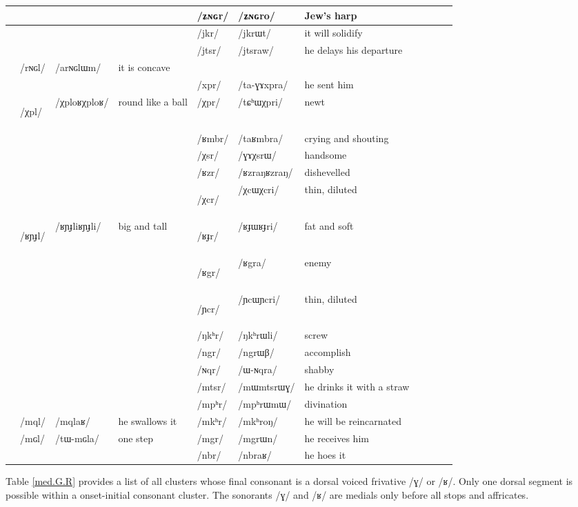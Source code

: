 \documentclass[oneside,a4paper,11pt]{article}
\newcommand{\ipa}[1]{\mbox{\phon/#1/}}
\newcommand{\trois}[1]{\ipa{#1}\addtocounter{3clusters}{1}}
\newcommand{\tib}[1]{\cellcolor{lightgray}\textbf{#1}}
\newcommand{\idph}[1]{\cellcolor{gray}\textbf{#1}}
\newcommand{\resetcounters}[2]{
\newcounter{#1}
\newcounter{#2}
 \setcounter{#1}{\value{2clusters}}
  \setcounter{#2}{\value{3clusters}}
 \setcounter{2clusters}{0}
  \setcounter{3clusters}{0}
}
\begin{document}
\begin{table}
{\begin{tabular}{l|lll|lll|lll|l}
	&	&	&	& \trois{ʑɴɢr}  	& \ipa{ʑɴɢro}  	&Jew's harp 	\\	
\midrule							
	&	&	&	&\trois{jkr}  	& \ipa{jkrɯt}  	& it will solidify \\	
	&	&	&	&\trois{jtsr}  	& \ipa{jtsraw}  	&he delays his departure \\	
\midrule			
	& \trois{rɴɢl}  	& \ipa{arɴɢlɯm}  	&it is concave 	&	&	&\\	
	&	&	&	& \trois{xpr}  	& \ipa{ta-ɣɤxpra}  	&he sent him \\	
\midrule							
	&\trois{χpl} \idph{}	&\ipa{χploʁχploʁ}  	&round like a ball	&\trois{χpr}  	& \ipa{tɕʰɯχpri}  	& newt\\	
	&	&	&	&\trois{ʁmbr}  	& \ipa{taʁmbra}  	& crying and shouting\\	
	&	&	&	&\trois{χsr}  	& \ipa{ɣɤχsrɯ}  	& handsome \\	
	&	&	&	&\trois{ʁzr}  	& \ipa{ʁzraŋʁzraŋ}  	& dishevelled\\	
	&	&	&	&\trois{χcr} \idph{} 	& \ipa{χcɯχcri}  	& thin, diluted \\	
	&\trois{ʁɲɟl}  \idph{}	& \ipa{ʁɲɟliʁɲɟli}  	& big and tall	&\trois{ʁɟr}  \idph{}	& \ipa{ʁɟɯʁɟri}  	& fat and soft\\	
	&	&	&	&\trois{ʁgr} \tib{}  	& \ipa{ʁgra}  	& enemy\\	
\midrule							
	&	&	&	&\trois{ɲcr} \idph{} 	& \ipa{ɲcɯɲcri}  	&thin, diluted \\	
	&	&	&	&\trois{ŋkʰr}  	& \ipa{ŋkʰrɯli}  	&screw \\	
	&	&	&	&\trois{ngr}  	& \ipa{ngrɯβ}  	& accomplish \\
	&	&	&	&\trois{ɴqr}  	& \ipa{ɯ-ɴqra}  	& shabby \\	
\midrule							
	&	&	&	&\trois{mtsr}  	& \ipa{mɯmtsrɯɣ}  	&he drinks it with a straw \\	
	&	&	&	&\trois{mpʰr}  	& \ipa{mpʰrɯmɯ}  	& divination\\	
	&\trois{mql}  	& \ipa{mqlaʁ}  	& he swallows it	&\trois{mkʰr}  	& \ipa{mkʰroŋ}  	&he will be reincarnated \\	
	&\trois{mɢl}  	& \ipa{tɯ-mɢla}  	& one step	&\trois{mgr}  	& \ipa{mgrɯn}  	& he receives him\\	
\midrule							
	&	&	&	&\trois{nbr}  	& \ipa{nbraʁ}  	&he hoes it \\	
\end{tabular}}
\end{table}	
			  \resetcounters{2Clr}{3Clr} %
 Table \ref{med.G.R} provides a  list of all clusters whose final consonant is a dorsal voiced frivative  \ipa{ɣ} or \ipa{ʁ}.  Only one dorsal segment is possible within a onset-initial consonant cluster. The sonorants \ipa{ɣ} and \ipa{ʁ} are medials only before all stops and affricates.
						
\end{document}
